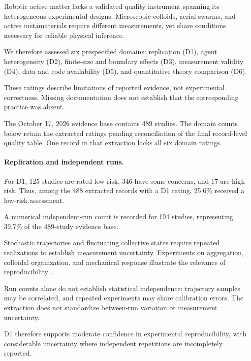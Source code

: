 Robotic active matter lacks a validated quality
instrument spanning its heterogeneous experimental
designs. Microscopic colloids, aerial swarms,
and active metamaterials require different
measurements, yet share conditions necessary
for reliable physical inference.

We therefore assessed six prespecified domains:
replication (D1), agent heterogeneity (D2),
finite-size and boundary effects (D3),
measurement validity (D4), data and code
availability (D5), and quantitative theory
comparison (D6).

These ratings describe limitations of reported
evidence, not experimental correctness.
Missing documentation does not establish
that the corresponding practice was absent.

The October 17, 2026 evidence base contains
489 studies. The domain counts below retain
the extracted ratings pending reconciliation
of the final record-level quality table.
One record in that extraction lacks all
six domain ratings.

\paragraph*{Replication and independent runs.}

For D1, 125 studies are rated low risk,
346 have some concerns, and 17 are high risk.
Thus, among the 488 extracted records
with a D1 rating, 25.6\% received
a low-risk assessment.

A numerical independent-run count is recorded
for 194 studies, representing 39.7\% of
the 489-study evidence base.

Stochastic trajectories and fluctuating collective
states require repeated realizations to establish
measurement uncertainty. Experiments on aggregation,
colloidal organization, and mechanical response
illustrate the relevance of reproducibility
\cite{Garnier2005aggregationbehaviou,Buerle2020formationofstable,Heuthe2025tunablecolloidalsw,Arbel2025amechanicalroutef,Boudet2025nonmarkoviandynami,Chen2024persistentandrespo,Wang2025hyperuniformnetwork}.

Run counts alone do not establish statistical
independence: trajectory samples may be correlated,
and repeated experiments may share calibration
errors. The extraction does not standardize
between-run variation or measurement uncertainty.

D1 therefore supports moderate confidence
in experimental reproducibility, with
considerable uncertainty where independent
repetitions are incompletely reported.

